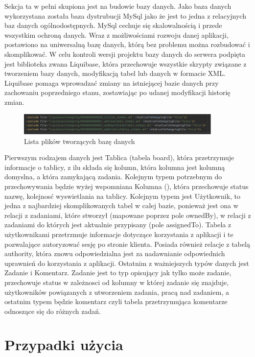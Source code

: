 Sekcja ta w pełni skupiona jest na budowie bazy danych. Jako baza danych wykorzystana została baza dystrubucji MySql jako że jest to jedna z relacyjnych baz danych ogólnodostępnych. MySql cechuje się skalowalnością i przede wszystkim ochroną danych. Wraz z możliwościami rozwoju danej aplikacji, postawiono na uniwersalną bazę danych, którą bez problemu można rozbudować i skomplikować.
W celu kontroli wersji projektu bazy danych do serwera podpięta jest biblioteka zwana Liquibase, która przechowuje wszystkie skrypty związane z tworzeniem bazy danych, modyfikacją tabel lub danych w formacie XML. Liquibase pomaga wprowadzać zmiany na istniejącej bazie danych przy zachowaniu poprzedniego stanu, zostawiając po udanej modyfikacji historię zmian. 
\begin{figure}[h]
	\centering
	\includegraphics[width=0.90\textwidth]{liqubase}		
	\caption{Lista plików tworzących bazę danych }
\end{figure}


Pierwszym rodzajem danych jest Tablica (tabela board), która przetrzymuje informacje o tablicy, z ilu  składa się kolumn, która kolumna jest kolumną domyslna, a która zamykającą zadania.
Kolejnym typem potrzebnym do przechowywania będzie wyżej wspomniana Kolumna (), która przechowuje status nazwę, kolejnosć wyswietlania na tablicy. Kolejnym typem jest Użytkownik, to jedna z najbardziej skomplikowanych tabel w całej bazie, ponieważ jest ona w relacji z zadaniami, które stworzył (mapowane poprzez pole ownedBy), w relacji z zadaniami do których jest aktualnie przypisany (pole assignedTo). Tabela z użytkownikami przetrzmuje informacje dotyczące korzystania z aplikacji i te  pozwalające autoryzować sesję po stronie klienta. Posiada również relacje z tabelą authority, która znowu odpowiedzialna jest za nadawnianie odpowiednich uprawnień do korzystania z aplikacji. Ostatnim z ważniejszych typów danych jest Zadanie i Komentarz. Zadanie jest to typ opisujący jak tylko może zadanie, przechowuje status w zależnosci od kolumny w której zadanie się znajduje, użytkowników powiązanych z utworzeniem zadania, pracą nad zadaniem, a ostatnim typem będzie komentarz czyli tabela przetrzymująca komentarze odnoszące się do różnych zadań.

\section{Przypadki użycia}

